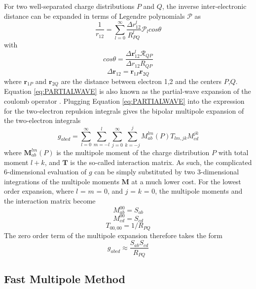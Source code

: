 For two well-separated charge distributions $P$ and $Q$, the inverse inter-electronic distance can be expanded in terms of Legendre polynomials $\mathcal{P}$ as
\begin{equation}
\frac{1}{r_{12}} = \sum_{l=0}^{\infty} \frac{\Delta r_{12}^l}{R_{PQ}^l} \mathcal{P}_{l} cos \theta
\label{eq:PARTIALWAVE}
\end{equation}
\noindent with 
\begin{equation}
cos \theta = \frac{\Delta \mathbf{r}_{12}^l \mathcal{R}_{QP}}{\Delta r_{12} R_{QP}} 
\end{equation}
\begin{equation}
\Delta \mathbf{r}_{12} = \mathbf{r}_{1P} \mathbf{r}_{2Q}
\end{equation}
\noindent where $\mathbf{r}_{1P}$ and $\mathbf{r}_{2Q}$ are the distance between electron 1,2 and the centers $P$,$Q$. Equation \ref{eq:PARTIALWAVE} is also known as the partial-wave expansion of the coulomb operator \cite{Arf1970}. Plugging Equation \ref{eq:PARTIALWAVE} into the expression for the two-electron repulsion integrals gives the bipolar multipole expansion of the two-electron integrals
\begin{equation}
g_{abcd} = \sum_{l=0}^{\infty} \sum_{m=-l}^l \sum_{j=0}^{\infty} \sum_{k=-j}^{j} M_{ab}^{lm}(P) T_{lm,jk} M_{cd}^{jk}
\end{equation}
\noindent where $\mathbf{M}_{ab}^{lm}(P)$ is the multipole moment of the charge distribution $P$ with total moment $l+k$, and $\mathbf{T}$ is the so-called interaction matrix. As such, the complicated 6-dimensional evaluation of $g$ can be simply substituted by two 3-dimensional integrations of the multipole moments $\mathbf{M}$ at a much lower cost. For the lowest order expansion, where $l$ = $m$ = 0, and $j$ = $k$ = 0, the multipole moments and the interaction matrix become 
\begin{equation}
M_{ab}^{00} = S_{ab}
\end{equation}
\begin{equation}
M_{cd}^{00} = S_{cd}
\end{equation}
\begin{equation}
T_{00,00} = 1/R_{PQ}
\end{equation}
\noindent The zero order term of the multipole expansion therefore takes the form
\begin{equation}
g_{abcd} \approx \frac{S_{ab}S_{cd}}{R_{PQ}}
\end{equation}

\subsection{Fast Multipole Method}

